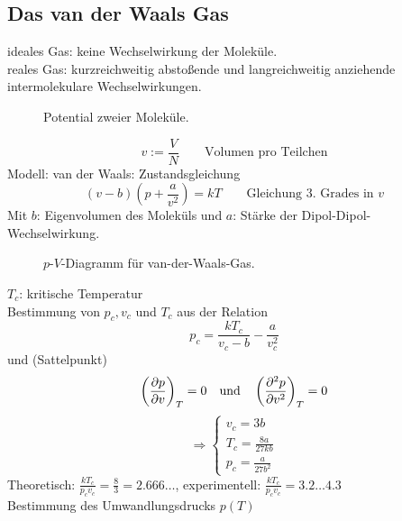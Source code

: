 \subsection{Das van der Waals Gas}
ideales Gas: keine Wechselwirkung der Moleküle.\\
reales Gas: kurzreichweitig abstoßende und langreichweitig anziehende intermolekulare Wechselwirkungen. \\

\begin{figure}[H]
        \centering
        \def\svgwidth{0.5\textwidth}
        
        \caption{Potential zweier Moleküle.}
        \label{img:UvanderWaals}
\end{figure}

\begin{equation}
    v := \frac{V}{N} \qquad \text{Volumen pro Teilchen}
\end{equation}
Modell: van der Waals: Zustandsgleichung
\begin{equation}
    (v-b) \left( p+\frac{a}{v^2} \right) = k T \qquad \text{Gleichung 3. Grades in }v
\end{equation}
Mit $b$: Eigenvolumen des Moleküls und $a$: Stärke der Dipol-Dipol-Wechselwirkung.\\

\begin{figure}[H]
        \centering
        \def\svgwidth{0.5\textwidth}
        
        \caption{$p$-$V$-Diagramm für van-der-Waals-Gas.}
        \label{img:label}
\end{figure}

$T_c$: kritische Temperatur \\
Bestimmung von $p_c, v_c$ und $T_c$ aus der Relation
\begin{equation}
    p_c = \frac{k T_c}{v_c - b} - \frac{a}{v_c^2}
\end{equation}
und (Sattelpunkt)
\begin{equation}
    \left( \frac{\partial p}{\partial v} \right)_{T} = 0 \quad \text{und} \quad \left( \frac{\partial^2 p}{\partial v^2} \right)_T = 0
\end{equation}
\begin{equation}
    \Rightarrow
    \begin{cases}
        v_c = 3 b \\
        T_c = \frac{8 a}{27 k b} \\
        p_c = \frac{a}{27 b^2}
    \end{cases}
\end{equation}
Theoretisch: $\frac{k T_c}{p_c v_c} = \frac{8}{3} = 2.666\ldots$, experimentell: $\frac{k T_c}{p_c v_c} = 3.2 \ldots 4.3$ \\
Bestimmung des Umwandlungsdrucks $p(T)$ \\

